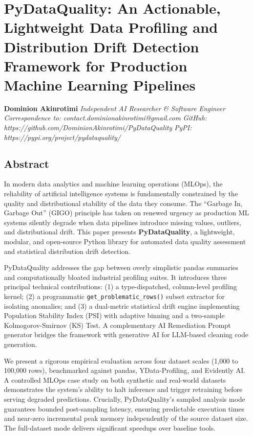 \documentclass{article}
\author{}
\date{}
\begin{document}
\section{PyDataQuality: An Actionable, Lightweight Data Profiling and
Distribution Drift Detection Framework for Production Machine Learning
Pipelines}\label{pydataquality-an-actionable-lightweight-data-profiling-and-distribution-drift-detection-framework-for-production-machine-learning-pipelines}

\textbf{Dominion Akinrotimi} \emph{Independent AI Researcher \& Software
Engineer} \emph{Correspondence to: contact.dominionakinrotimi@gmail.com}
\emph{GitHub: https://github.com/DominionAkinrotimi/PyDataQuality}
\emph{PyPI: https://pypi.org/project/pydataquality/}

\subsection{Abstract}\label{abstract}

In modern data analytics and machine learning operations (MLOps), the
reliability of artificial intelligence systems is fundamentally
constrained by the quality and distributional stability of the data they
consume. The ``Garbage In, Garbage Out'' (GIGO) principle has taken on
renewed urgency as production ML systems silently degrade when data
pipelines introduce missing values, outliers, and distributional drift.
This paper presents \textbf{PyDataQuality}, a lightweight, modular, and
open-source Python library for automated data quality assessment and
statistical distribution drift detection.

PyDataQuality addresses the gap between overly simplistic pandas
summaries and computationally bloated industrial profiling suites. It
introduces three principal technical contributions: (1) a
type-dispatched, column-level profiling kernel; (2) a programmatic
\texttt{get\_problematic\_rows()} subset extractor for isolating
anomalies; and (3) a dual-metric statistical drift engine implementing
Population Stability Index (PSI) with adaptive binning and a two-sample
Kolmogorov-Smirnov (KS) Test. A complementary AI Remediation Prompt
generator bridges the framework with generative AI for LLM-based
cleaning code generation.

We present a rigorous empirical evaluation across four dataset scales
(1,000 to 100,000 rows), benchmarked against pandas, YData-Profiling,
and Evidently AI. A controlled MLOps case study on both synthetic and
real-world datasets demonstrates the system's ability to halt inference
and trigger retraining before serving degraded predictions. Crucially,
PyDataQuality's sampled analysis mode guarantees bounded post-sampling
latency, ensuring predictable execution times and near-zero incremental
peak memory independently of the source dataset size. The full-dataset
mode delivers significant speedups over baseline tools.
\end{document}
